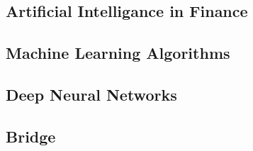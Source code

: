 \subsection{Artificial Intelligance in Finance}


\subsection{Machine Learning Algorithms}


\subsection{Deep Neural Networks}


\subsection{Bridge}
